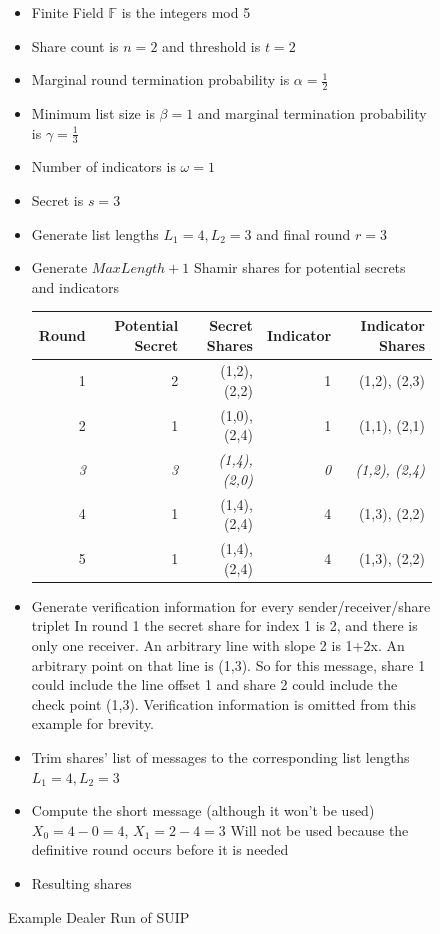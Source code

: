 \documentclass{dalcsthesis}
\begin{document}
\begin{figure}
  \caption{Example Dealer Run of SUIP}
  \label{Ex:SUIP}
  \begin{itemize}
    \item Finite Field $\mathbb{F}$ is the integers mod 5
    \item Share count is $n = 2$ and threshold is $t = 2$
    \item Marginal round termination probability is $\alpha = \frac{1}{2}$
    \item Minimum list size is $\beta = 1$ and marginal termination probability is $\gamma = \frac{1}{3}$
    \item Number of indicators is $\omega = 1$
    \item Secret is $s = 3$
    \item Generate list lengths $L_1 = 4, L_2 = 3$ and final round $r = 3$
    \item Generate $MaxLength+1$ Shamir shares for potential secrets and indicators
  
      \begin{tabular}{|r|r|r|r|r|}
      \hline
        Round & Potential Secret & Secret Shares & Indicator & Indicator Shares \\
      \hline
        1 & 2  & (1,2), (2,2) & 1 & (1,2), (2,3) \\
      \hline
        2 & 1  & (1,0), (2,4) & 1 & (1,1), (2,1) \\
      \hline
        \emph{3} & \emph{3}  & \emph{(1,4), (2,0)} & \emph{0} & \emph{(1,2), (2,4)} \\
      \hline
        4 & 1  & (1,4), (2,4) & 4 & (1,3), (2,2) \\
      \hline
        5 & 1  & (1,4), (2,4) & 4 & (1,3), (2,2) \\
      \hline
      \end{tabular}
      
    \item Generate verification information for every sender/receiver/share triplet
    \subitem In round 1 the secret share for index 1 is 2, and there is only one receiver. An arbitrary line with slope 2 is 1+2x. An arbitrary point on that line is (1,3). So for this message, share 1 could include the line offset 1 and share 2 could include the check point (1,3).
    \subitem Verification information is omitted from this example for brevity.
    
    \item Trim shares' list of messages to the corresponding list lengths $L_1 = 4, L_2 = 3$
    \item Compute the short message (although it won't be used)
    \subitem $X_0 = 4 - 0 = 4$, $X_1 = 2 - 4 = 3$
    \subitem Will not be used because the definitive round occurs before it is needed
    \item Resulting shares
    

\end{itemize}
\end{figure}
\end{document}
